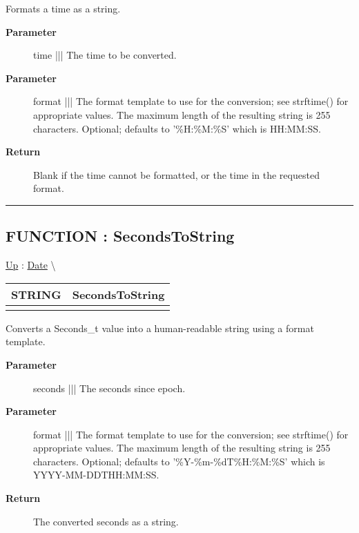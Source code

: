 \par
Formats a time as a string.

\par
\begin{description}
\item [\textbf{Parameter}] time ||| The time to be converted.
\item [\textbf{Parameter}] format ||| The format template to use for the conversion; see strftime() for appropriate values. The maximum length of the resulting string is 255 characters. Optional; defaults to '\%H:\%M:\%S' which is HH:MM:SS.
\item [\textbf{Return}] Blank if the time cannot be formatted, or the time in the requested format.
\end{description}

\rule{\linewidth}{0.5pt}
\subsection*{FUNCTION : SecondsToString}
\hypertarget{ecldoc:date.secondstostring}{}
\hyperlink{ecldoc:Date}{Up} :
\hspace{0pt} \hyperlink{ecldoc:Date}{Date} \textbackslash 

{\renewcommand{\arraystretch}{1.5}
\begin{tabularx}{\textwidth}{|>{\raggedright\arraybackslash}l|X|}
\hline
\hspace{0pt}STRING & SecondsToString \\
\hline
\multicolumn{2}{|>{\raggedright\arraybackslash}X|}{\hspace{0pt}(Seconds\_t seconds, VARSTRING format = '\%Y-\%m-\%dT\%H:\%M:\%S')} \\
\hline
\end{tabularx}
}

\par
Converts a Seconds\_t value into a human-readable string using a format template.

\par
\begin{description}
\item [\textbf{Parameter}] seconds ||| The seconds since epoch.
\item [\textbf{Parameter}] format ||| The format template to use for the conversion; see strftime() for appropriate values. The maximum length of the resulting string is 255 characters. Optional; defaults to '\%Y-\%m-\%dT\%H:\%M:\%S' which is YYYY-MM-DDTHH:MM:SS.
\item [\textbf{Return}] The converted seconds as a string.
\end{description}

